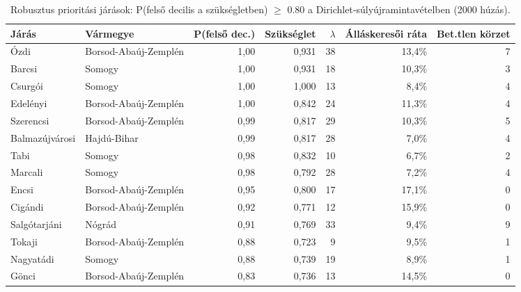 \begin{table}[htbp]
\centering
\small
\begin{tabular}{llrrrrr}
\toprule
Járás & Vármegye & P(felső dec.) & Szükséglet & $\lambda$ & Álláskeresői ráta & Bet.tlen körzet \\
\midrule
Ózdi & Borsod-Abaúj-Zemplén & 1{,}00 & 0{,}931 & 38 & 13{,}4\% & 7 \\
Barcsi & Somogy & 1{,}00 & 0{,}931 & 18 & 10{,}3\% & 3 \\
Csurgói & Somogy & 1{,}00 & 1{,}000 & 13 & 8{,}4\% & 4 \\
Edelényi & Borsod-Abaúj-Zemplén & 1{,}00 & 0{,}842 & 24 & 11{,}3\% & 4 \\
Szerencsi & Borsod-Abaúj-Zemplén & 0{,}99 & 0{,}817 & 29 & 10{,}3\% & 5 \\
Balmazújvárosi & Hajdú-Bihar & 0{,}99 & 0{,}817 & 28 & 7{,}0\% & 4 \\
Tabi & Somogy & 0{,}98 & 0{,}832 & 10 & 6{,}7\% & 2 \\
Marcali & Somogy & 0{,}98 & 0{,}792 & 28 & 7{,}2\% & 4 \\
Encsi & Borsod-Abaúj-Zemplén & 0{,}95 & 0{,}800 & 17 & 17{,}1\% & 0 \\
Cigándi & Borsod-Abaúj-Zemplén & 0{,}92 & 0{,}771 & 12 & 15{,}9\% & 0 \\
Salgótarjáni & Nógrád & 0{,}91 & 0{,}769 & 33 & 9{,}4\% & 9 \\
Tokaji & Borsod-Abaúj-Zemplén & 0{,}88 & 0{,}723 & 9 & 9{,}5\% & 1 \\
Nagyatádi & Somogy & 0{,}88 & 0{,}739 & 19 & 8{,}9\% & 1 \\
Gönci & Borsod-Abaúj-Zemplén & 0{,}83 & 0{,}736 & 13 & 14{,}5\% & 0 \\
\bottomrule
\end{tabular}
\caption{Robusztus prioritási járások: P(felső decilis a szükségletben) $\ge$ 0.80 a Dirichlet‑súlyújramintavételben (2000 húzás).}
\label{tab:robust}
\end{table}
